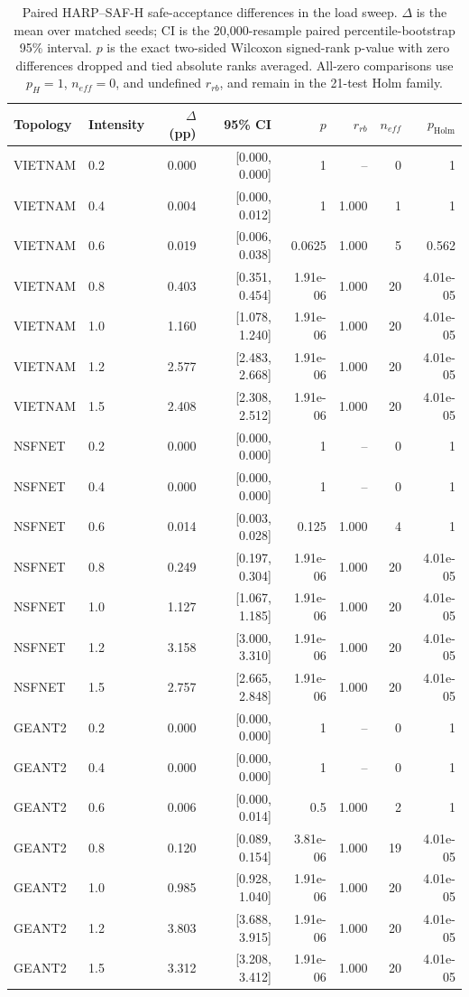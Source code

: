 \begin{table}[p]
\centering
\color{revisiongreen}\small
\begin{tabular}{llrrrrrr}
\toprule
Topology & Intensity & $\Delta$ (pp) & 95\% CI & $p$ & $r_{rb}$ & $n_{eff}$ & $p_{\mathrm{Holm}}$ \\
\midrule
VIETNAM & 0.2 & 0.000 & [0.000, 0.000] & 1 & -- & 0 & 1 \\
VIETNAM & 0.4 & 0.004 & [0.000, 0.012] & 1 & 1.000 & 1 & 1 \\
VIETNAM & 0.6 & 0.019 & [0.006, 0.038] & 0.0625 & 1.000 & 5 & 0.562 \\
VIETNAM & 0.8 & 0.403 & [0.351, 0.454] & 1.91e-06 & 1.000 & 20 & 4.01e-05 \\
VIETNAM & 1.0 & 1.160 & [1.078, 1.240] & 1.91e-06 & 1.000 & 20 & 4.01e-05 \\
VIETNAM & 1.2 & 2.577 & [2.483, 2.668] & 1.91e-06 & 1.000 & 20 & 4.01e-05 \\
VIETNAM & 1.5 & 2.408 & [2.308, 2.512] & 1.91e-06 & 1.000 & 20 & 4.01e-05 \\
NSFNET & 0.2 & 0.000 & [0.000, 0.000] & 1 & -- & 0 & 1 \\
NSFNET & 0.4 & 0.000 & [0.000, 0.000] & 1 & -- & 0 & 1 \\
NSFNET & 0.6 & 0.014 & [0.003, 0.028] & 0.125 & 1.000 & 4 & 1 \\
NSFNET & 0.8 & 0.249 & [0.197, 0.304] & 1.91e-06 & 1.000 & 20 & 4.01e-05 \\
NSFNET & 1.0 & 1.127 & [1.067, 1.185] & 1.91e-06 & 1.000 & 20 & 4.01e-05 \\
NSFNET & 1.2 & 3.158 & [3.000, 3.310] & 1.91e-06 & 1.000 & 20 & 4.01e-05 \\
NSFNET & 1.5 & 2.757 & [2.665, 2.848] & 1.91e-06 & 1.000 & 20 & 4.01e-05 \\
GEANT2 & 0.2 & 0.000 & [0.000, 0.000] & 1 & -- & 0 & 1 \\
GEANT2 & 0.4 & 0.000 & [0.000, 0.000] & 1 & -- & 0 & 1 \\
GEANT2 & 0.6 & 0.006 & [0.000, 0.014] & 0.5 & 1.000 & 2 & 1 \\
GEANT2 & 0.8 & 0.120 & [0.089, 0.154] & 3.81e-06 & 1.000 & 19 & 4.01e-05 \\
GEANT2 & 1.0 & 0.985 & [0.928, 1.040] & 1.91e-06 & 1.000 & 20 & 4.01e-05 \\
GEANT2 & 1.2 & 3.803 & [3.688, 3.915] & 1.91e-06 & 1.000 & 20 & 4.01e-05 \\
GEANT2 & 1.5 & 3.312 & [3.208, 3.412] & 1.91e-06 & 1.000 & 20 & 4.01e-05 \\
\bottomrule
\end{tabular}
\caption{Paired HARP--SAF-H safe-acceptance differences in the load sweep. $\Delta$ is the mean over matched seeds; CI is the 20,000-resample paired percentile-bootstrap 95\% interval. $p$ is the exact two-sided Wilcoxon signed-rank p-value with zero differences dropped and tied absolute ranks averaged. All-zero comparisons use $p_H=1$, $n_{eff}=0$, and undefined $r_{rb}$, and remain in the 21-test Holm family.}
\label{tab:load_sweep_paired_statistics}
\end{table}
